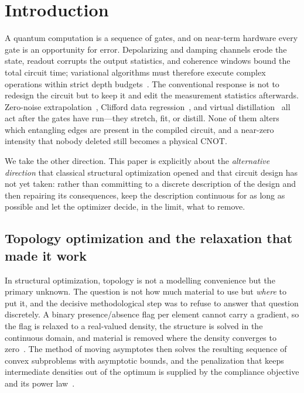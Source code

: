 \documentclass[twocolumn,aps,prl,superscriptaddress,showkeys]{revtex4-2}
\theoremstyle{plain}
\theoremstyle{definition}
\begin{document}

\maketitle

\section{Introduction}
\label{sec:intro}

A quantum computation is a sequence of gates, and on near-term hardware every gate is an opportunity for error. Depolarizing and damping channels erode the state, readout corrupts the output statistics, and coherence windows bound the total circuit time; variational algorithms must therefore execute complex operations within strict depth budgets~\cite{Preskill2018,Kim2023}. The conventional response is not to redesign the circuit but to keep it and edit the measurement statistics afterwards. Zero-noise extrapolation~\cite{Temme2017,Kandala2019}, Clifford data regression~\cite{Czarnik2021}, and virtual distillation~\cite{Huggins2021} all act after the gates have run---they stretch, fit, or distill. None of them alters which entangling edges are present in the compiled circuit, and a near-zero intensity that nobody deleted still becomes a physical CNOT.

We take the other direction. This paper is explicitly about the \emph{alternative direction} that classical structural optimization opened and that circuit design has not yet taken: rather than committing to a discrete description of the design and then repairing its consequences, keep the description continuous for as long as possible and let the optimizer decide, in the limit, what to remove.

\subsection{Topology optimization and the relaxation that made it work}

In structural optimization, topology is not a modelling convenience but the primary unknown. The question is not how much material to use but \emph{where} to put it, and the decisive methodological step was to refuse to answer that question discretely. A binary presence/absence flag per element cannot carry a gradient, so the flag is relaxed to a real-valued density, the structure is solved in the continuous domain, and material is removed where the density converges to zero~\cite{Svanberg1987}. The method of moving asymptotes then solves the resulting sequence of convex subproblems with asymptotic bounds, and the penalization that keeps intermediate densities out of the optimum is supplied by the compliance objective and its power law~\cite{Boyd2004}.
\end{document}
